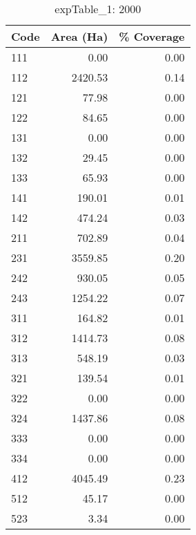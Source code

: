 \begin{table}[ht]
\centering
\begin{tabular}{lrr}
  \hline
Code & Area (Ha) & \% Coverage \\ 
  \hline
111 & 0.00 & 0.00 \\ 
  112 & 2420.53 & 0.14 \\ 
  121 & 77.98 & 0.00 \\ 
  122 & 84.65 & 0.00 \\ 
  131 & 0.00 & 0.00 \\ 
  132 & 29.45 & 0.00 \\ 
  133 & 65.93 & 0.00 \\ 
  141 & 190.01 & 0.01 \\ 
  142 & 474.24 & 0.03 \\ 
  211 & 702.89 & 0.04 \\ 
  231 & 3559.85 & 0.20 \\ 
  242 & 930.05 & 0.05 \\ 
  243 & 1254.22 & 0.07 \\ 
  311 & 164.82 & 0.01 \\ 
  312 & 1414.73 & 0.08 \\ 
  313 & 548.19 & 0.03 \\ 
  321 & 139.54 & 0.01 \\ 
  322 & 0.00 & 0.00 \\ 
  324 & 1437.86 & 0.08 \\ 
  333 & 0.00 & 0.00 \\ 
  334 & 0.00 & 0.00 \\ 
  412 & 4045.49 & 0.23 \\ 
  512 & 45.17 & 0.00 \\ 
  523 & 3.34 & 0.00 \\ 
   \hline
\end{tabular}
\caption{expTable\_1: 2000} 
\end{table}
